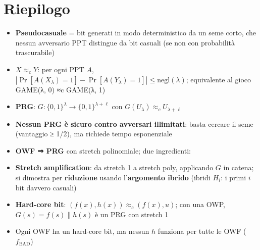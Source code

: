 \section{Riepilogo}

\begin{itemize}
\tightlist
\item
  \textbf{Pseudocasuale} = bit generati in modo deterministico da un seme corto, che nessun avversario PPT distingue da bit casuali (se non con probabilità trascurabile)
\item
  \(X \approx_c Y\): per ogni PPT \(A\), \(|\Pr[A(X_\lambda) = 1] - \Pr[A(Y_\lambda) = 1]| \le \text{negl}(\lambda)\); equivalente al gioco GAME(λ, 0) ≈c GAME(λ, 1)
\item
  \textbf{PRG}: \(G : \{0,1\}^\lambda \to \{0,1\}^{\lambda+\ell}\) con \(G(U_\lambda) \approx_c U_{\lambda+\ell}\)
\item
  \textbf{Nessun PRG è sicuro contro avversari illimitati}: basta cercare il seme (vantaggio ≥ 1/2), ma richiede tempo esponenziale
\item
  \textbf{OWF ⇒ PRG} con stretch polinomiale; due ingredienti:
\item
  \textbf{Stretch amplification}: da stretch 1 a stretch poly, applicando \(G\) in catena; si dimostra per \textbf{riduzione} usando l'\textbf{argomento ibrido} (ibridi \(H_i\): i primi \(i\) bit davvero casuali)
\item
  \textbf{Hard-core bit}: \((f(x), h(x)) \approx_c (f(x), u)\); con una OWP, \(G(s) = f(s) \| h(s)\) è un PRG con stretch 1
\item
  Ogni OWF ha un hard-core bit, ma nessun \(h\) funziona per tutte le OWF (\(f_{\text{BAD}}\))
\end{itemize}
